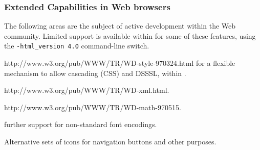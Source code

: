 \subsubsection*{Extended Capabilities in Web browsers}
The following areas are the subject of active development
within the Web community. 
Limited support is available within \latextohtml{} for some of these features,
using the \texttt{-html\_version 4.0} command-line switch.
\begin{description}
%
%
%
\item [style-sheets: ] %
{http://www.w3.org/pub/WWW/TR/WD-style-970324.html}
for a flexible mechanism to allow cascading (CSS) and DSSSL, 
within \HTMLiv.
%
%
%
\item [XML: ] %
{http://www.w3.org/pub/WWW/TR/WD-xml.html}.

%
%
\item [MathML: ] %
{http://www.w3.org/pub/WWW/TR/WD-math-970515}.

%
\item [Fonts: ] further support for non-standard font encodings.

%
\item [Icons: ] Alternative sets of icons for navigation buttons 
and other purposes.
\end{description}



\endinput















